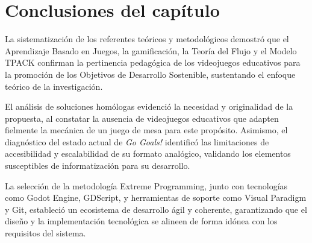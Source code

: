 \section*{Conclusiones del capítulo}

La sistematización de los referentes teóricos y metodológicos demostró que el Aprendizaje Basado en Juegos, la gamificación, la Teoría del Flujo y el Modelo TPACK confirman la pertinencia pedagógica de los videojuegos educativos para la promoción de los Objetivos de Desarrollo Sostenible, sustentando el enfoque teórico de la investigación.

El análisis de soluciones homólogas evidenció la necesidad y originalidad de la propuesta, al constatar la ausencia de videojuegos educativos que adapten fielmente la mecánica de un juego de mesa para este propósito. Asimismo, el diagnóstico del estado actual de \textit{Go Goals!} identificó las limitaciones de accesibilidad y escalabilidad de su formato analógico, validando los elementos susceptibles de informatización para su desarrollo.

La selección de la metodología Extreme Programming, junto con tecnologías como Godot Engine, GDScript, y herramientas de soporte como Visual Paradigm y Git, estableció un ecosistema de desarrollo ágil y coherente, garantizando que el diseño y la implementación tecnológica se alineen de forma idónea con los requisitos del sistema.
